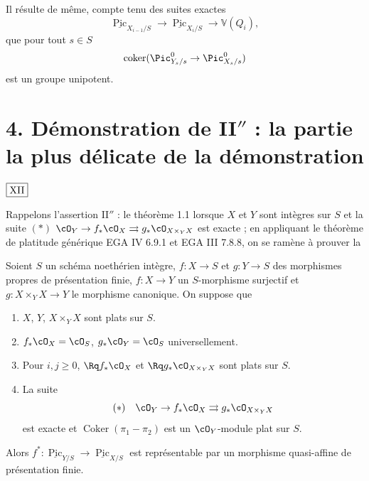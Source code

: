 \begin{rem*}\label{rem:3.6}
Il résulte de même, compte tenu des suites exactes
\[
\underline{\operatorname{Pic}}_{X_{i-1}/S} \to \underline{\operatorname{Pic}}_{X_i/S} \to \mathbb{V}(Q_i),
\]
que pour tout $s \in S$
\[
\operatorname{coker}(\Pic^0_{Y_s/s} \to \Pic^0_{X_s/s})
\]
est un groupe unipotent.
\end{rem*}

\section*{4. Démonstration de II$''$ : la partie la plus délicate de la démonstration}

\begin{flushright}
$\fbox{\text{XII}}$
\end{flushright}

Rappelons l'assertion II$''$ : le théorème 1.1 lorsque $X$ et $Y$ sont intègres sur $S$ et la suite $(*)$
$\cO_Y \to f_* \cO_X \rightrightarrows g_* \cO_{X \times_Y X}$ est exacte ; en appliquant le théorème de platitude générique EGA IV 6.9.1 et EGA III 7.8.8, on se ramène à prouver la

\begin{prop}\label{prop:4.1} Soient $S$ un schéma noethérien intègre, $f : X \to S$ et $g : Y \to S$ des morphismes propres de présentation finie, $f : X \to Y$ un $S$-morphisme surjectif et $g : X \times_Y X \to Y$ le morphisme canonique. On suppose que
\begin{enumerate}[label={\arabic*)}]
\item $X$, $Y$, $X \times_Y X$ sont plats sur $S$.
\item $f_* \cO_X = \cO_S$, $g_* \cO_Y = \cO_S$ universellement.
\item Pour $i,j \geq 0$, $\Rq f_* \cO_X$ et $\Rq g_* \cO_{X \times_Y X}$ sont plats sur $S$.
\item La suite
\[
(*) \quad \cO_Y \to f_* \cO_X \rightrightarrows g_* \cO_{X \times_Y X}
\]
est exacte et $\operatorname{Coker}(\pi_1 - \pi_2)$ est un $\cO_Y$-module plat sur $S$.
\end{enumerate}
Alors $f^* : \underline{\operatorname{Pic}}_{Y/S} \to \underline{\operatorname{Pic}}_{X/S}$ est représentable par un morphisme quasi-affine de présentation finie.
\end{prop}

